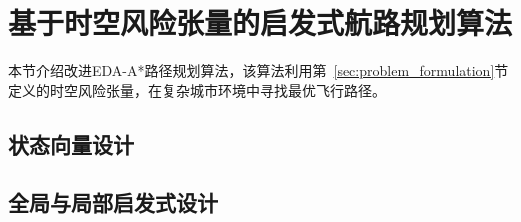 
\section{基于时空风险张量的启发式航路规划算法}
\label{sec:algorithm}

本节介绍改进EDA-A*路径规划算法，该算法利用第~\ref{sec:problem_formulation}节定义的时空风险张量，在复杂城市环境中寻找最优飞行路径。

\subsection{状态向量设计}



\subsection{全局与局部启发式设计}


